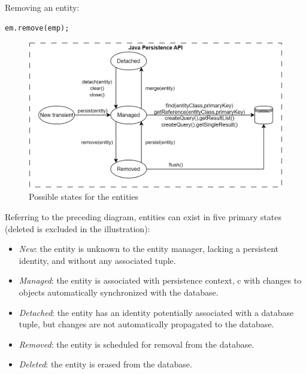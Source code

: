 \begin{example}
    Removing an entity:
    \begin{lstlisting}[style=Java]
em.remove(emp);
    \end{lstlisting}
\end{example}
\begin{figure}[H]
    \centering
    \includegraphics[width=0.75\linewidth]{images/jpaem.png}
    \caption{Possible states for the entities}
\end{figure}
Referring to the preceding diagram, entities can exist in five primary states (deleted is excluded in the illustration):
\begin{itemize}
    \item \textit{New}: the entity is unknown to the entity manager, lacking a persistent identity, and without any associated tuple.
    \item \textit{Managed}: the entity is associated with persistence context, c with changes to objects automatically synchronized with the database.
    \item \textit{Detached}: the entity has an identity potentially associated with a database tuple, but changes are not automatically propagated to the database.
    \item \textit{Removed}: the entity is scheduled for removal from the database.
    \item \textit{Deleted}: the entity is erased from the database. 
\end{itemize}

